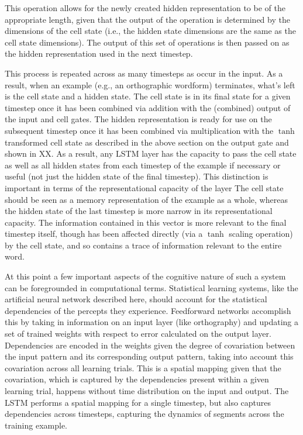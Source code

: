\documentclass[
  american,
  man,floatsintext]{apa6}
\begin{document}
This operation allows for the newly created hidden representation to be of the appropriate length, given that the output of the operation is determined by the dimensions of the cell state (i.e., the hidden state dimensions are the same as the cell state dimensions). The output of this set of operations is then passed on as the hidden representation used in the next timestep.

This process is repeated across as many timesteps as occur in the input. As a result, when an example (e.g., an orthographic wordform) terminates, what's left is the cell state and a hidden state. The cell state is in its final state for a given timestep once it has been combined via addition with the (combined) output of the input and cell gates. The hidden representation is ready for use on the subsequent timestep once it has been combined via multiplication with the \(\tanh\) transformed cell state as described in the above section on the output gate and shown in XX. As a result, any LSTM layer has the capacity to pass the cell state as well as all hidden states from each timestep of the example if necessary or useful (not just the hidden state of the final timestep). This distinction is important in terms of the representational capacity of the layer The cell state should be seen as a memory representation of the example as a whole, whereas the hidden state of the last timestep is more narrow in its representational capacity. The information contained in this vector is more relevant to the final timestep itself, though has been affected directly (via a \(\tanh\) scaling operation) by the cell state, and so contains a trace of information relevant to the entire word.

At this point a few important aspects of the cognitive nature of such a system can be foregrounded in computational terms. Statistical learning systems, like the artificial neural network described here, should account for the statistical dependencies of the percepts they experience. Feedforward networks accomplish this by taking in information on an input layer (like orthography) and updating a set of trained weights with respect to error calculated on the output layer. Dependencies are encoded in the weights given the degree of covariation between the input pattern and its corresponding output pattern, taking into account this covariation across all learning trials. This is a spatial mapping given that the covariation, which is captured by the dependencies present within a given learning trial, happens without time distribution on the input and output. The LSTM performs a spatial mapping for a single timestep, but also captures dependencies across timesteps, capturing the dynamics of segments across the training example.
\end{document}
